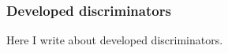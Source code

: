 \subsubsection{Developed discriminators}
\label{sub:developed_discriminators}

Here I write about developed discriminators.